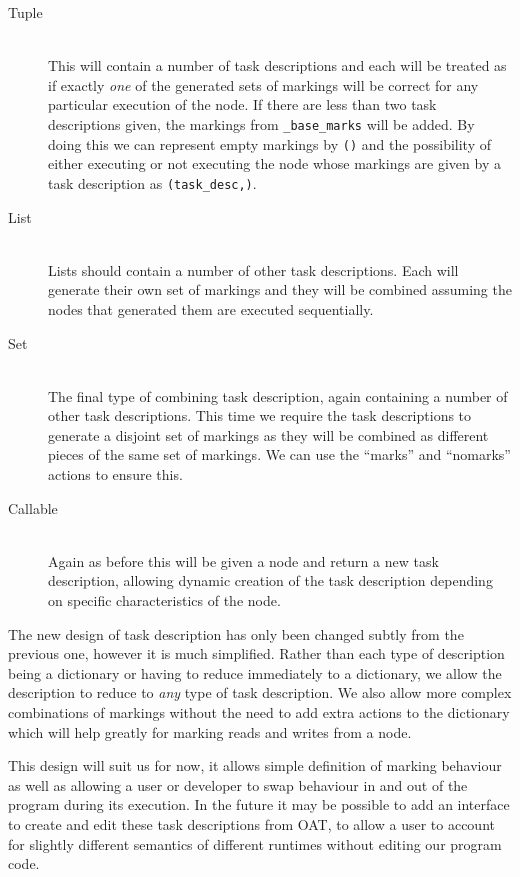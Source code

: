 \documentclass[twoside,a4paper]{report}
\begin{document}
\begin{description}
\item[Tuple] \hfill \\
This will contain a number of task descriptions and each will be treated as if exactly \textit{one} of the generated sets of markings will be correct
for any particular execution of the node. If there are less than two task descriptions given, the markings from \texttt{\_base\_marks} will be added.
By doing this we can represent empty markings by \texttt{()} and the possibility of either executing or not executing the node whose markings are
given by a task description as \texttt{(task\_desc,)}.

\item[List] \hfill \\
Lists should contain a number of other task descriptions. Each will generate their own set of markings and they will be combined assuming the nodes
that generated them are executed sequentially.

\item[Set] \hfill \\
The final type of combining task description, again containing a number of other task descriptions. This time we require the task descriptions to
generate a disjoint set of markings as they will be combined as different pieces of the same set of markings. We can use the ``marks'' and ``nomarks''
actions to ensure this.

\item[Callable] \hfill \\
Again as before this will be given a node and return a new task description, allowing dynamic creation of the task description depending on
specific characteristics of the node.

\end{description}

The new design of task description has only been changed subtly from the previous one, however it is much simplified. Rather than each type of
description being a dictionary or having to reduce immediately to a dictionary, we allow the description to reduce to \textit{any} type of 
task description. We also allow more complex combinations of markings without the need to add extra actions to the dictionary which will
help greatly for marking reads and writes from a node.

This design will suit us for now, it allows simple definition of marking behaviour as well as allowing a user or developer to swap behaviour in
and out of the program during its execution. In the future it may be possible to add an interface to create and edit these task descriptions from
OAT, to allow a user to account for slightly different semantics of different runtimes without editing our program code.
\end{document}
